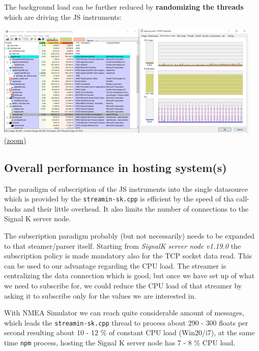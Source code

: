 \documentclass[11pt]{article}
\begin{document}
    The background load can be further reduced by \textbf{randomizing the
threads} which are driving the JS instruments:

    \includegraphics{2020-01-22_dgb_procexp_12_instrucjs_clients_alpha_02_randomized_threads.png}
\href{img/2020-01-22_dgb_procexp_12_instrucjs_clients_alpha_02_randomized_threads.png}{(zoom)}

    \hypertarget{overall-performance-in-hosting-systems}{%
\subsection{Overall performance in hosting
system(s)}\label{overall-performance-in-hosting-systems}}

    The paradigm of subscription of the JS instruments into the single
datasource which is provided by the \texttt{streamin-sk.cpp} is
efficient by the speed of tha call-backs and their little overhead. It
also limits the number of connections to the Signal K server node.

    The subscription paradigm probably (but not necessarily) needs to be
expanded to that steamer/parser itself. Starting from \emph{SignalK
server node v1.19.0} the subscription policy is made mandatory also for
the TCP socket data read. This can be used to our advantage regarding
the CPU load. The streamer is centralizing the data connection which is
good, but once we have set up of what we need to subscribe for, we could
reduce the CPU load of that streamer by asking it to subscribe only for
the values we are interested in.

    With NMEA Simulator we can reach quite considerable amount of messages,
which leads the \texttt{streamin-sk.cpp} thread to process about 290 -
300 floats per second resulting about 10 - 12 \% of constant CPU load
(Win20/i7), at the same time \texttt{npm} process, hosting the Signal K
server node has 7 - 8 \% CPU load.
\end{document}
